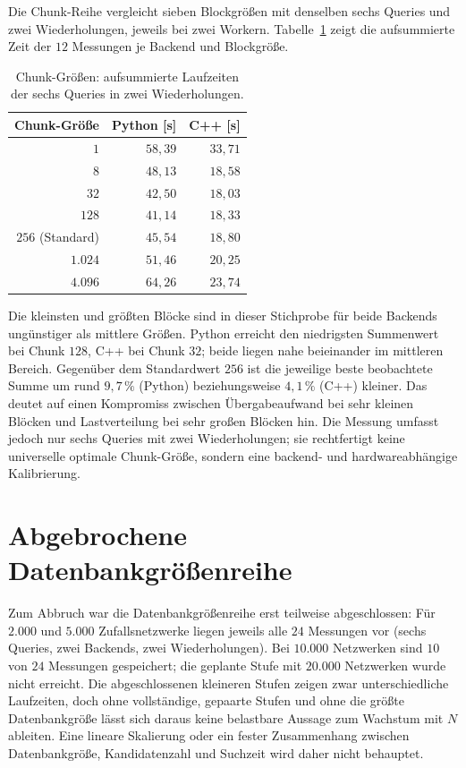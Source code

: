 \documentclass[a4paper,12pt, twoside]{report}
\theoremstyle{definition}
\begin{document}
Die Chunk-Reihe vergleicht sieben Blockgrößen mit denselben sechs Queries und zwei Wiederholungen, jeweils bei zwei Workern. Tabelle~\ref{tab:multiomics_chunksize} zeigt die aufsummierte Zeit der $12$ Messungen je Backend und Blockgröße.

\begin{table}[!htbp]
\centering
\small
\caption{Chunk-Größen: aufsummierte Laufzeiten der sechs Queries in zwei Wiederholungen.}
\label{tab:multiomics_chunksize}
\begin{tabular}{@{}rrr@{}}
\toprule
Chunk-Größe & Python [s] & C++ [s] \\
\midrule
$1$ & $58{,}39$ & $33{,}71$ \\
$8$ & $48{,}13$ & $18{,}58$ \\
$32$ & $42{,}50$ & $18{,}03$ \\
$128$ & $41{,}14$ & $18{,}33$ \\
$256$ (Standard) & $45{,}54$ & $18{,}80$ \\
$1.024$ & $51{,}46$ & $20{,}25$ \\
$4.096$ & $64{,}26$ & $23{,}74$ \\
\bottomrule
\end{tabular}
\end{table}

Die kleinsten und größten Blöcke sind in dieser Stichprobe für beide Backends ungünstiger als mittlere Größen. Python erreicht den niedrigsten Summenwert bei Chunk $128$, C++ bei Chunk $32$; beide liegen nahe beieinander im mittleren Bereich. Gegenüber dem Standardwert $256$ ist die jeweilige beste beobachtete Summe um rund $9{,}7\,\%$ (Python) beziehungsweise $4{,}1\,\%$ (C++) kleiner. Das deutet auf einen Kompromiss zwischen Übergabeaufwand bei sehr kleinen Blöcken und Lastverteilung bei sehr großen Blöcken hin. Die Messung umfasst jedoch nur sechs Queries mit zwei Wiederholungen; sie rechtfertigt keine universelle optimale Chunk-Größe, sondern eine backend- und hardwareabhängige Kalibrierung.

\section{Abgebrochene Datenbankgrößenreihe}
\label{sec:multiomics_dbsize}

Zum Abbruch war die Datenbankgrößenreihe erst teilweise abgeschlossen: Für $2.000$ und $5.000$ Zufallsnetzwerke liegen jeweils alle $24$ Messungen vor (sechs Queries, zwei Backends, zwei Wiederholungen). Bei $10.000$ Netzwerken sind $10$ von $24$ Messungen gespeichert; die geplante Stufe mit $20.000$ Netzwerken wurde nicht erreicht. Die abgeschlossenen kleineren Stufen zeigen zwar unterschiedliche Laufzeiten, doch ohne vollständige, gepaarte Stufen und ohne die größte Datenbankgröße lässt sich daraus keine belastbare Aussage zum Wachstum mit $N$ ableiten. Eine lineare Skalierung oder ein fester Zusammenhang zwischen Datenbankgröße, Kandidatenzahl und Suchzeit wird daher nicht behauptet.
\end{document}
